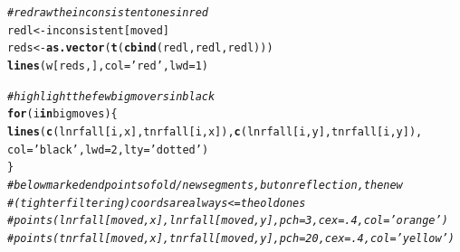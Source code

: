 \documentclass{article}\usepackage[]{graphicx}\usepackage[]{color}
\makeatletter
\newcommand{\hlnum}[1]{\textcolor[rgb]{0.686,0.059,0.569}{#1}}%
\newcommand{\hlstr}[1]{\textcolor[rgb]{0.192,0.494,0.8}{#1}}%
\newcommand{\hlcom}[1]{\textcolor[rgb]{0.678,0.584,0.686}{\textit{#1}}}%
\newcommand{\hlstd}[1]{\textcolor[rgb]{0.345,0.345,0.345}{#1}}%
\newcommand{\hlkwa}[1]{\textcolor[rgb]{0.161,0.373,0.58}{\textbf{#1}}}%
\newcommand{\hlkwb}[1]{\textcolor[rgb]{0.69,0.353,0.396}{#1}}%
\newcommand{\hlkwc}[1]{\textcolor[rgb]{0.333,0.667,0.333}{#1}}%
\newcommand{\hlkwd}[1]{\textcolor[rgb]{0.737,0.353,0.396}{\textbf{#1}}}%
\newenvironment{kframe}{%
 \def\at@end@of@kframe{}%
 \ifinner\ifhmode%
  \def\at@end@of@kframe{\end{minipage}}%
  \begin{minipage}{\columnwidth}%
 \fi\fi%
 \def\FrameCommand##1{\hskip\@totalleftmargin \hskip-\fboxsep
 \colorbox{shadecolor}{##1}\hskip-\fboxsep
     \hskip-\linewidth \hskip-\@totalleftmargin \hskip\columnwidth}%
 \MakeFramed {\advance\hsize-\width
   \@totalleftmargin\z@ \linewidth\hsize
   \@setminipage}}%
 {\par\unskip\endMakeFramed%
 \at@end@of@kframe}
\newenvironment{knitrout}{}{} %
\makeatother
\begin{document}
\begin{knitrout}
\begin{kframe}
\begin{alltt}
  \hlcom{# redraw the inconsistent ones in red}
  \hlstd{redl} \hlkwb{<-} \hlstd{inconsistent[moved]}
  \hlstd{reds} \hlkwb{<-} \hlkwd{as.vector}\hlstd{(}\hlkwd{t}\hlstd{(}\hlkwd{cbind}\hlstd{(redl,redl,redl)))}
  \hlkwd{lines}\hlstd{(w[reds,],}\hlkwc{col}\hlstd{=}\hlstr{'red'}\hlstd{,}\hlkwc{lwd}\hlstd{=}\hlnum{1}\hlstd{)}

  \hlcom{# highlight the few big movers in black}
  \hlkwa{for}\hlstd{(i} \hlkwa{in} \hlstd{bigmoves)\{}
    \hlkwd{lines}\hlstd{(}\hlkwd{c}\hlstd{(lnrfall[i,x],tnrfall[i,x]),}\hlkwd{c}\hlstd{(lnrfall[i,y], tnrfall[i,y]),}
          \hlkwc{col}\hlstd{=}\hlstr{'black'}\hlstd{,}\hlkwc{lwd}\hlstd{=}\hlnum{2}\hlstd{,}\hlkwc{lty}\hlstd{=}\hlstr{'dotted'}\hlstd{)}
  \hlstd{\}}
  \hlcom{# below marked end points of old/new segments, but on reflection, the new}
  \hlcom{# (tighter filtering) coords are always <= the old ones}
  \hlcom{#points(lnrfall[  moved,x], lnrfall[  moved,y], pch=3, cex=.4, col='orange')}
  \hlcom{#points(tnrfall[  moved,x], tnrfall[  moved,y], pch=20,cex=.4, col='yellow')}


\end{alltt}
\end{kframe}
\end{knitrout}
\end{document}
